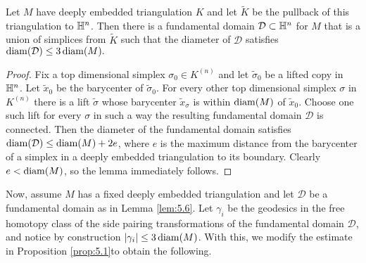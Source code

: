 \begin{lem}  \label{lem:5.6} Let $M$ have deeply embedded triangulation $K$ and let $\tilde K$ be the pullback of this triangulation to $\mathbb H^n$.
Then there is a fundamental domain $\mathcal D\subset \mathbb H^n$ for $M$ that is a union of simplices from $\tilde K$ such that the diameter of $\mathcal D$ satisfies $\operatorname{diam}(\mathcal D) \leq 3\operatorname{diam}(M).$ \end{lem}
\begin{proof}
Fix a top dimensional simplex $\sigma_0\in K^{(n)}$ and let $\tilde \sigma_0$ be a lifted copy in $\mathbb H^n$. Let $\tilde x_0$ be the barycenter of $\tilde \sigma_0$. For every other top dimensional simplex $\sigma$ in $K^{(n)}$ there is a lift 	$\tilde \sigma$ whose barycenter $\tilde x_{\sigma}$ is within $\operatorname{diam}(M)$ of $\tilde x_0$. Choose one such lift for every $\sigma$ in such a way the resulting fundamental domain $\mathcal D$ is connected. Then the diameter of the fundamental domain satisfies $\operatorname{diam}(\mathcal D)\leq \operatorname{diam}(M) + 2e$, where $e$ is the maximum distance from the barycenter of a simplex in a deeply embedded triangulation to its boundary. Clearly $e<\operatorname{diam}(M)$, so the lemma immediately follows.
\end{proof}


Now, assume $M$ has a fixed deeply embedded triangulation and let $\mathcal D$ be a fundamental domain as in Lemma \ref{lem:5.6}. Let $\gamma_i$ be the geodesics in the free homotopy class of the side pairing transformations of the fundamental domain $\mathcal D$, and notice by construction $|\gamma_i|\leq 3\operatorname{diam}(M)$. With this, we modify the estimate in Proposition \ref{prop:5.1}to obtain the following.

